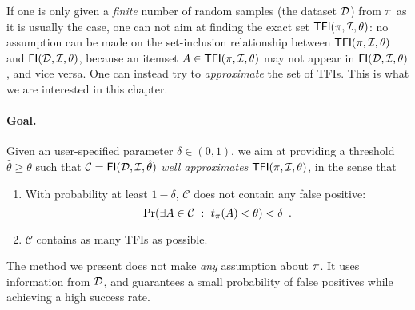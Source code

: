 If one is only given a \emph{finite} number of random
samples (the dataset ${\cal D}$) from $\pi$ as it is usually the case, one can not
aim at finding the exact set $\mathsf{TFI}(\pi,{\cal I},\theta)$: no assumption can be
made on the set-inclusion relationship between $\mathsf{TFI}(\pi,{\cal I},\theta)$ and
$\mathsf{FI}({\cal D},{\cal I},\theta)$,
because an itemset $A\in\mathsf{TFI}(\pi,{\cal I},\theta)$ may not appear in
$\mathsf{FI}({\cal D},{\cal I},\theta)$, and vice versa. One can instead try
to \emph{approximate} the set of TFIs. This is what we are interested in this
chapter.

\paragraph{Goal.} Given an user-specified
parameter $\delta\in(0,1)$, we aim at providing a threshold
$\hat{\theta}\ge\theta$ such that $\mathcal{C}=\mathsf{FI}({\cal D},{\cal I},\hat{\theta})$
\emph{well approximates} $\mathsf{TFI}(\pi,{\cal I},\theta)$, in the sense that 
\begin{enumerate}
  \item With probability at least $1-\delta$, $\mathcal{C}$ does not contain any
    false positive: %
  \[
  \Pr(\exists A\in\mathcal{C} ~:~ t_\pi(A)<\theta)<\delta\enspace.\]
\item $\mathcal{C}$ contains as many TFIs as possible.

  \end{enumerate}
The %
method we present does not make \emph{any} assumption about %
$\pi$. It uses information from ${\cal D}$, and guarantees a small probability of
false positives while achieving a high success rate.

